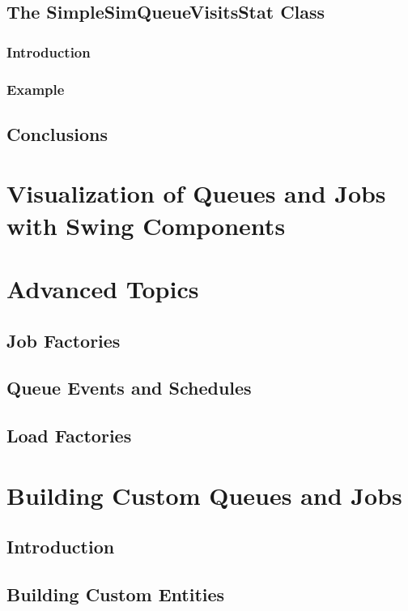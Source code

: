 \documentclass[12pt]{book}
\begin{document}
\section{The SimpleSimQueueVisitsStat Class}

\subsection{Introduction}

\subsection{Example}

\section{Conclusions}

\chapter{Visualization of Queues and Jobs with Swing Components}

\chapter{Advanced Topics}

\section{Job Factories}

\section{Queue Events and Schedules}

\section{Load Factories}

\chapter{Building Custom Queues and Jobs}

\section{Introduction}

\section{Building Custom Entities}
\end{document}
